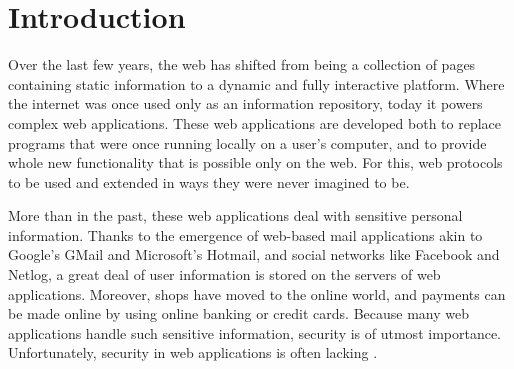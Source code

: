 \chapter{Introduction}

Over the last few years, the web has shifted from being a collection of pages containing static information to a dynamic and fully interactive platform. Where the internet was once used only as an information repository, today it powers complex web applications. These web applications are developed both to replace programs that were once running locally on a user's computer, and to provide whole new functionality that is possible only on the web. For this, web protocols to be used and extended in ways they were never imagined to be.

More than in the past, these web applications deal with sensitive personal information. Thanks to the emergence of web-based mail applications akin to Google's GMail and Microsoft's Hotmail, and social networks like Facebook and Netlog, a great deal of user information is stored on the servers of web applications. Moreover, shops have moved to the online world, and payments can be made online by using online banking or credit cards. Because many web applications handle such sensitive information, security is of utmost importance. Unfortunately, security in web applications is often lacking \cite{Brown2010}.


